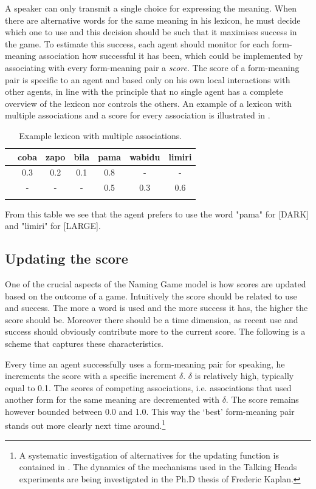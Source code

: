 A speaker can only transmit a single choice for 
expressing the meaning.
When there are alternative words for the same meaning in 
his lexicon, he must decide which one to use and this decision
should be such that it maximises success in the game. 
To estimate this success, 
each agent should monitor for each form-meaning association
how successful it has been, which could be implemented 
by associating with every form-meaning pair 
a {\it score}. The score of a form-meaning pair
is specific to an agent and based only on his own 
local interactions with other agents, in line with the 
principle that no single agent has a complete overview of 
the lexicon nor controls the others. An example of 
a lexicon with multiple associations and a score for every 
association is illustrated in . 
\begin{table}
\begin{center}
\begin{tabular}{c c c c  c  c  c } \midrule 
& coba & zapo & bila & pama & wabidu & limiri \\ \midrule 
[DARK] & 0.3 & 0.2 & 0.1 & 0.8 & - & - \\ \midrule
[LARGE] & - & - & - & 0.5 & 0.3 & 0.6 \\ \midrule
\lspbottomrule
\end{tabular}
\caption{\label{tab:mem2} Example lexicon with multiple associations.}
\end{center}
\end{table}
From this table we see that the agent prefers to use the 
word "pama" for [DARK] and "limiri" for [LARGE]. 

\subsection{Updating the score}

One of the crucial aspects of the Naming Game model
is how scores are updated based on the outcome of 
a game. Intuitively 
the score should be related to use and success. 
The more a word is used and the more success it 
has, the higher the score should be. Moreover
there should be a time dimension, 
as recent use and success should obviously contribute
more to the current score. 
The following is a scheme that captures these
characteristics. 

Every time an agent successfully uses a form-meaning pair 
for speaking, he increments
the score with a specific increment $\delta$. 
$\delta$ is relatively high, typically equal to 0.1. 
The scores of competing associations, i.e. 
associations that used another form for the same meaning
are decremented with $\delta$. The score remains however bounded 
between 0.0 and 1.0. This way the `best' 
form-meaning pair stands out more clearly next time 
around.\footnote{A systematic investigation of alternatives for 
the updating function is contained in \cite{Oliphant:1997}. 
The dynamics of the mechanisms used in the 
Talking Heads experiments are being investigated in the
Ph.D thesis of Frederic Kaplan.}

